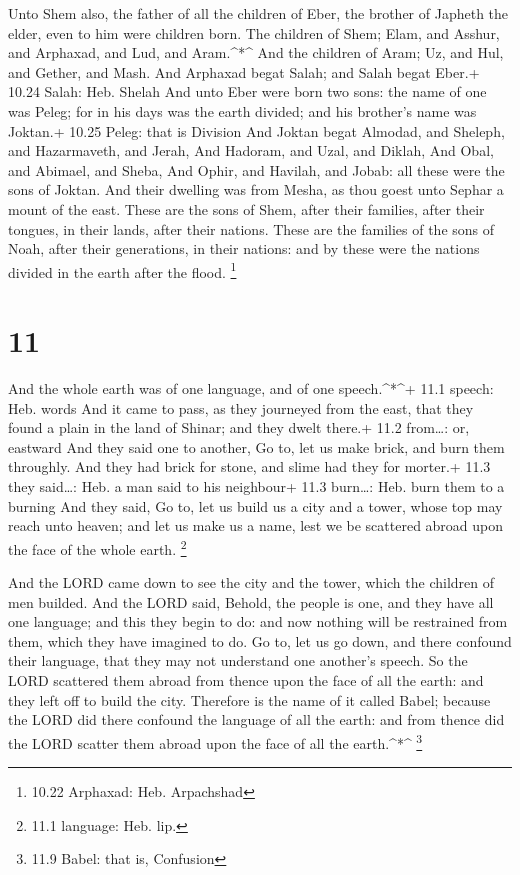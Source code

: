  Unto Shem also, the father of all the children of Eber,
the brother of Japheth the elder, even to him were children born.
 The children of Shem; Elam, and Asshur, and Arphaxad, and
Lud, and Aram.\^{}*\^{}  And the children of Aram; Uz, and
Hul, and Gether, and Mash.  And Arphaxad begat Salah; and
Salah begat Eber.+ 10.24 Salah: Heb. Shelah  And unto Eber
were born two sons: the name of one was Peleg; for in his days was the
earth divided; and his brother's name was Joktan.+ 10.25 Peleg: that is
Division  And Joktan begat Almodad, and Sheleph, and
Hazarmaveth, and Jerah,  And Hadoram, and Uzal, and Diklah,
 And Obal, and Abimael, and Sheba,  And Ophir,
and Havilah, and Jobab: all these were the sons of Joktan. 
And their dwelling was from Mesha, as thou goest unto Sephar a mount of
the east.  These are the sons of Shem, after their
families, after their tongues, in their lands, after their nations.
 These are the families of the sons of Noah, after their
generations, in their nations: and by these were the nations divided in
the earth after the flood. \footnote{10.22 Arphaxad: Heb. Arpachshad}

\hypertarget{section-10}{%
\section{11}\label{section-10}}

 And the whole earth was of one language, and of one
speech.\^{}*\^{}+ 11.1 speech: Heb. words  And it came to
pass, as they journeyed from the east, that they found a plain in the
land of Shinar; and they dwelt there.+ 11.2 from\ldots: or, eastward
 And they said one to another, Go to, let us make brick, and
burn them throughly. And they had brick for stone, and slime had they
for morter.+ 11.3 they said\ldots: Heb. a man said to his neighbour+
11.3 burn\ldots: Heb. burn them to a burning  And they said,
Go to, let us build us a city and a tower, whose top may reach unto
heaven; and let us make us a name, lest we be scattered abroad upon the
face of the whole earth. \footnote{11.1 language: Heb. lip.}

 And the LORD came down to see the city and the tower, which
the children of men builded.  And the LORD said, Behold, the
people is one, and they have all one language; and this they begin to
do: and now nothing will be restrained from them, which they have
imagined to do.  Go to, let us go down, and there confound
their language, that they may not understand one another's speech.
 So the LORD scattered them abroad from thence upon the face
of all the earth: and they left off to build the city. 
Therefore is the name of it called Babel; because the LORD did there
confound the language of all the earth: and from thence did the LORD
scatter them abroad upon the face of all the earth.\^{}*\^{} \footnote{11.9
  Babel: that is, Confusion}

